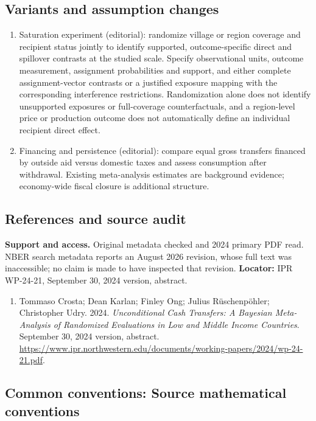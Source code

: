 \documentclass[11pt,a4paper]{article}
\begin{document}
\subsection*{Variants and assumption changes}
\begin{enumerate}
\item Saturation experiment (editorial): randomize village or region coverage and recipient status jointly to identify supported, outcome-specific direct and spillover contrasts at the studied scale. Specify observational units, outcome measurement, assignment probabilities and support, and either complete assignment-vector contrasts or a justified exposure mapping with the corresponding interference restrictions. Randomization alone does not identify unsupported exposures or full-coverage counterfactuals, and a region-level price or production outcome does not automatically define an individual recipient direct effect.
\item Financing and persistence (editorial): compare equal gross transfers financed by outside aid versus domestic taxes and assess consumption after withdrawal. Existing meta-analysis estimates are background evidence; economy-wide fiscal closure is additional structure.
\end{enumerate}
\subsection*{References and source audit}
\textbf{Support and access.} Original metadata checked and 2024 primary PDF read. NBER search metadata reports an August 2026 revision, whose full text was inaccessible; no claim is made to have inspected that revision. \textbf{Locator:} IPR WP-24-21, September 30, 2024 version, abstract.
\begin{enumerate}\raggedright
\item\hypertarget{definitions:source:30007654:1}{} Tommaso Crosta; Dean Karlan; Finley Ong; Julius R\"{u}schenpöhler; Christopher Udry. 2024. \emph{Unconditional Cash Transfers: A Bayesian Meta-Analysis of Randomized Evaluations in Low and Middle Income Countries}. September 30, 2024 version, abstract.
\url{https://www.ipr.northwestern.edu/documents/working-papers/2024/wp-24-21.pdf}.
\end{enumerate}

\subsection*{Common conventions: Source mathematical conventions}
\end{document}
